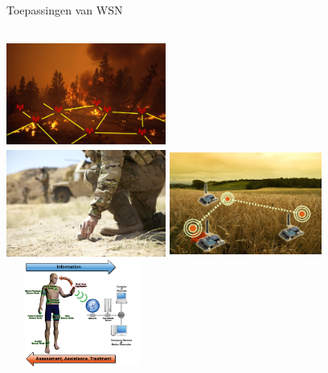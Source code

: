 \documentclass[presentation, bigger]{beamer}
\begin{document}
\begin{frame}[label=sec-1-3]{Toepassingen van WSN}

\begin{columns}[t]
\centering
\includegraphics[width=5.25cm,height=3.5cm]{graphics/sample_applications/fire.jpg}\\
\includegraphics[width=5.25cm,height=3.5cm]{graphics/sample_applications/military.jpg}
\centering
\includegraphics[width=5cm,height=3.5cm]{graphics/sample_applications/landbouw.jpg}\\
\includegraphics[width=5cm,height=3.5cm]{graphics/sample_applications/medicine.jpg}
\end{columns}

\end{frame}
\end{document}
